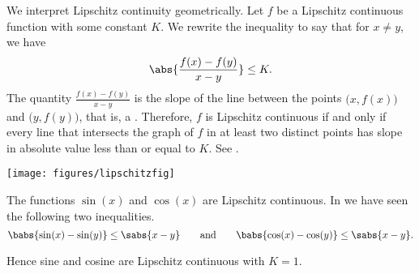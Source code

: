 We interpret Lipschitz continuity geometrically.  Let $f$ be a Lipschitz
continuous function with some constant $K$.  We rewrite the inequality 
to say that for $x \not=y$, we have
\begin{equation*}
\abs{\frac{f(x)-f(y)}{x-y}} \leq K .
\end{equation*}
The quantity $\frac{f(x)-f(y)}{x-y}$ is the slope of the line
between the points $\bigl(x,f(x)\bigr)$
and $\bigl(y,f(y)\bigr)$, that is, a \emph{}.  Therefore, $f$ is Lipschitz
continuous if and only if every line that intersects the graph of $f$ in at least two
distinct
points has slope in absolute value less than or equal to $K$.  See .
\begin{myfigureht}
\texttt{[image: figures/lipschitzfig]}
\caption{The slope of a secant line.
A function is Lipschitz if %
$\abs{\frac{f(x)-f(y)}{x-y}} \leq K$ for all $x$ and $y$.\label{fig:lipschitz}}
\end{myfigureht}

\begin{example}
The functions $\sin(x)$ and $\cos(x)$ are Lipschitz continuous.
In  we have seen the following two inequalities.
\begin{equation*}
\babs{\sin(x)-\sin(y)} 
\leq \sabs{x-y}
\qquad \text{and} \qquad
\babs{\cos(x)-\cos(y)}
\leq \sabs{x-y} .
\end{equation*}

Hence sine and cosine are Lipschitz continuous with $K=1$.
\end{example}

